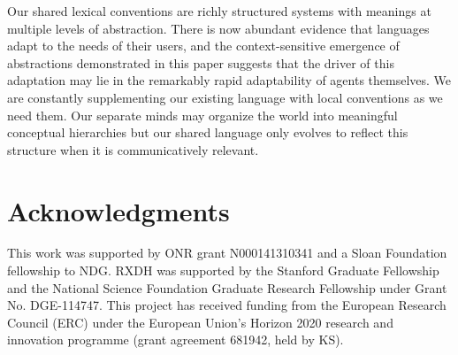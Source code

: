 \documentclass[10pt,letterpaper]{article}
\begin{document}
Our shared lexical conventions are richly structured systems with meanings at multiple levels of abstraction. There is now abundant evidence that languages adapt to the needs of their users, and the context-sensitive emergence of abstractions demonstrated in this paper suggests that the driver of this adaptation may lie in the remarkably rapid adaptability of agents themselves. We are constantly supplementing our existing language with local conventions as we need them. Our separate minds may organize the world into meaningful conceptual hierarchies but our shared language only evolves to reflect this structure when it is communicatively relevant. 

\section{\bf Acknowledgments}
\small
This work was supported by ONR grant N000141310341 and a Sloan Foundation fellowship to NDG. RXDH was supported by the Stanford Graduate Fellowship and the National Science Foundation Graduate Research Fellowship under Grant No. DGE-114747. This project has received funding from the European Research Council (ERC) under the European Union's Horizon 2020 research and innovation programme (grant agreement 681942, held by KS).
\vspace{-.20cm}


\setlength{\bibleftmargin}{.125in}
\setlength{\bibindent}{-\bibleftmargin}


\end{document}

